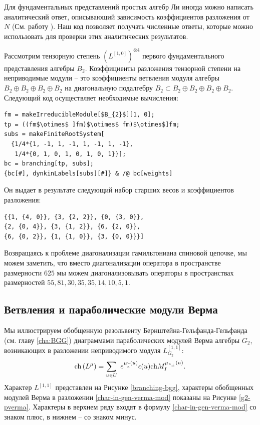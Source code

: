Для фундаментальных представлений простых алгебр Ли иногда можно написать аналитический ответ, описывающий зависимость коэффициентов разложения от  $N$ (См. работу \cite{LyakhovskyPostnova2011}). Наш код позволяет получать численные ответы, которые можно использовать для проверки этих аналитических результатов.

Рассмотрим тензорную степень $\left(L^{[1,0]}\right)^{\otimes 4}$ первого фундаментального представления алгебры $B_{2}$. Коэффициенты разложения тензорной степени на неприводимые модули -- это коэффициенты ветвления модуля алгебры $B_{2}\oplus B_{2}\oplus B_{2}\oplus B_{2}$ на диагональную подалгебру $B_{2}\subset B_{2}\oplus B_{2}\oplus B_{2}\oplus B_{2}$. Следующий код осуществляет необходимые вычисления:
\begin{lstlisting}[mathescape=true]
fm = makeIrreducibleModule[$B_{2}$][1, 0];
tp = ((fm$\otimes$ ]fm)$\otimes$ fm)$\otimes$]fm;
subs = makeFiniteRootSystem[
  {1/4*{1, -1, 1, -1, 1, -1, 1, -1}, 
   1/4*{0, 1, 0, 1, 0, 1, 0, 1}}];
bc = branching[tp, subs];
{bc[#], dynkinLabels[subs][#]} & /@ bc[weights]
\end{lstlisting}
Он выдает в результате следующий набор старших весов и коэффициентов разложения:
\begin{lstlisting}
{{1, {4, 0}}, {3, {2, 2}}, {0, {3, 0}}, 
{2, {0, 4}}, {3, {1, 2}}, {6, {2, 0}}, 
{6, {0, 2}}, {1, {1, 0}}, {3, {0, 0}}}]
\end{lstlisting}

Возвращаясь к проблеме диагонализации гамильтониана спиновой цепочке, мы можем заметить, что вместо диагонализации оператора в пространстве размерности  $625$ мы можем диагонализовывать операторы в пространствах размерностей $55, 81, 30, 35, 35, 14, 10, 5, 1$.

\subsection{Ветвления и параболические модули Верма}
\label{sec:branch-parab-verma}

Мы иллюстрируем обобщенную резольвенту Бернштейна-Гельфанда-Гельфанда (см. главу \ref{cha:BGG}) диаграммами параболических модулей Верма алгебры $G_{2}$, возникающих в разложении неприводимого модуля $L^{[1,1]}_{G_{2}}$:
\begin{equation}
\mathrm{ch}\left( L^{\mu }\right) =\sum_{u\in U}\;e^{\mu _{\widetilde{\mathfrak{a}}}\left(
u\right) }\epsilon (u)\mathrm{ch}M_{I}^{\mu _{\frak{a}_{\perp }}\left(
u\right) }.  \label{char-in-gen-verma-mod}
\end{equation}
Характер  $L^{[1,1]}$ представлен на Рисунке \ref{branching-bgg}, характеры обобщенных модулей Верма в разложении  \eqref{char-in-gen-verma-mod} показаны на Рисунке  \ref{g2-pverma}. Характеры в верхнем ряду входят в формулу \eqref{char-in-gen-verma-mod} со знаком плюс, в нижнем -- со знаком минус. 


